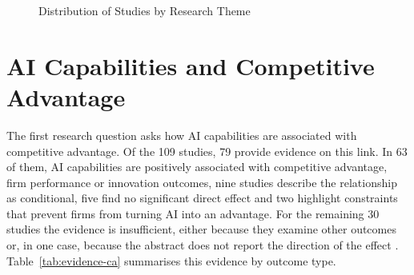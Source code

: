\begin{figure}[H]
  \centering
  \caption{Distribution of Studies by Research Theme}
  \label{fig:themes}
\end{figure}

\section{AI Capabilities and Competitive Advantage}
\label{sec:results-ai-ca}

The first research question asks how AI capabilities are associated with competitive advantage. Of the 109 studies, 79 provide evidence on this link. In 63 of them, AI capabilities are positively associated with competitive advantage, firm performance or innovation outcomes, nine studies describe the relationship as conditional, five find no significant direct effect and two highlight constraints that prevent firms from turning AI into an advantage. For the remaining 30 studies the evidence is insufficient, either because they examine other outcomes or, in one case, because the abstract does not report the direction of the effect \parencite[205]{chatterjee2021}. Table~\ref{tab:evidence-ca} summarises this evidence by outcome type.


